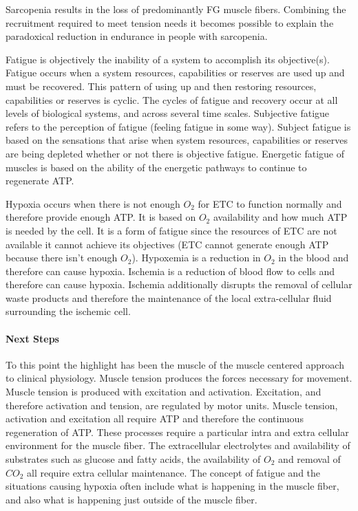 Sarcopenia results in the loss of predominantly FG muscle fibers. Combining the recruitment required to meet tension needs it becomes possible to explain the paradoxical reduction in endurance in people with sarcopenia. 

Fatigue is objectively the inability of a system to accomplish its objective(s). Fatigue occurs when a system resources, capabilities or reserves are used up and must be recovered. This pattern of using up and then restoring resources, capabilities or reserves is cyclic. The cycles of fatigue and recovery occur at all levels of biological systems, and across several time scales. Subjective fatigue refers to the perception of fatigue (feeling fatigue in some way). Subject fatigue is based on the sensations that arise when system resources, capabilities or reserves are being depleted whether or not there is objective fatigue. Energetic fatigue of muscles is based on the ability of the energetic pathways to continue to regenerate ATP.

Hypoxia occurs when there is not enough $O_2$ for ETC to function normally and therefore provide enough ATP. It is based on $O_2$ availability and how much ATP is needed by the cell. It is a form of fatigue since the resources of ETC are not available it cannot achieve its objectives (ETC cannot generate enough ATP because there isn't enough $O_2$). Hypoxemia is a reduction in $O_2$ in the blood and therefore can cause hypoxia. Ischemia is a reduction of blood flow to cells and therefore can cause hypoxia. Ischemia additionally disrupts the removal of cellular waste products and therefore the maintenance of the local extra-cellular fluid surrounding the ischemic cell. 

\paragraph{Next Steps}

To this point the highlight has been the muscle of the muscle centered approach to clinical physiology. Muscle tension produces the forces necessary for movement. Muscle tension is produced with excitation and activation. Excitation, and therefore activation and tension, are regulated by motor units. Muscle tension, activation and excitation all require ATP and therefore the continuous regeneration of ATP. These processes require a particular intra and extra cellular environment for the muscle fiber. The extracellular electrolytes and availability of substrates such as glucose and fatty acids, the availability of $O_2$ and removal of $CO_2$ all require extra cellular maintenance. The concept of fatigue and the situations causing hypoxia often include what is happening in the muscle fiber, and also what is happening just outside of the muscle fiber. 


